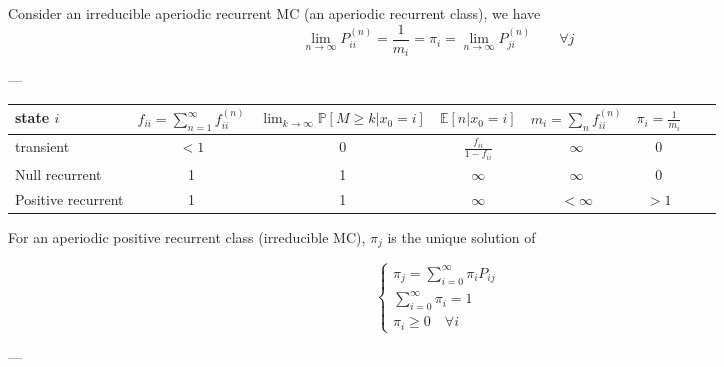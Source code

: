 	\begin{theorem}
		Consider an irreducible aperiodic recurrent MC (an aperiodic recurrent class), we have
		$$ \lim_{n\to \infty} P_{ii}^{(n)} = \frac{1}{m_i} = \pi_i = \lim_{n\to\infty} P_{ji}^{(n)} \qquad \forall j$$
	\end{theorem}
	---

	\begin{center}
		\begin{tabular}{|l*{6}{|c}r}
			\hline
			state $i$ & $f_{ii} = \sum_{n=1}^\infty f_{ii}^{(n)}$  & $\lim_{k \to \infty } \mathbb{P}[M \geq k | x_0=i]$ & $\mathbb{E}[n|x_0=i]$ & $m_i = \sum_n f_{ii}^{(n)}$ & $\pi_i = \frac{1}{m_i}$  \\ \hline

			transient & $<1$ & 0 & $\frac{f_{ii}}{1-f_{ii}}$ & $\infty$ & 0 \\ \hline
			Null recurrent & 1 & 1 & $\infty$ & $\infty$ & 0 \\ \hline
			Positive recurrent & 1 & 1 & $\infty$ & $<\infty$ & $>1$ \\ \hline
		\end{tabular}
	\end{center}

	\begin{theorem}
		For an aperiodic positive recurrent class (irreducible MC), $\pi_j$ is the unique solution of

		$$\begin{cases}
			\pi_j = \sum_{i=0}^\infty \pi_i P_{ij} \\
			\sum_{i=0}^\infty \pi_i = 1 \\
			\pi_i \geq 0 \quad \forall i
		\end{cases}$$
	\end{theorem}
	---

